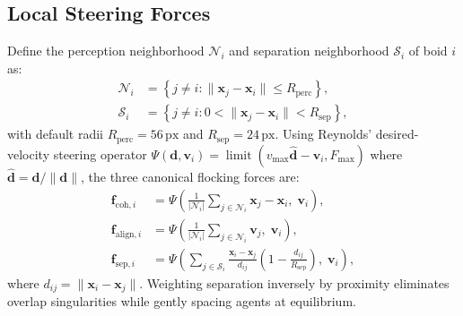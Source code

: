 \documentclass[10pt,twocolumn]{article}
\begin{document}
\subsection{Local Steering Forces}
Define the perception neighborhood $\mathcal{N}_i$ and separation neighborhood $\mathcal{S}_i$ of boid $i$ as:
\begin{align}
    \mathcal{N}_i &= \left\{ j \neq i : \|\mathbf{x}_j - \mathbf{x}_i\| \le R_{\text{perc}} \right\}, \\
    \mathcal{S}_i &= \left\{ j \neq i : 0 < \|\mathbf{x}_j - \mathbf{x}_i\| < R_{\text{sep}} \right\},
\end{align}
with default radii $R_{\text{perc}} = 56\,\text{px}$ and $R_{\text{sep}} = 24\,\text{px}$. Using Reynolds' desired-velocity steering operator $\Psi(\mathbf{d}, \mathbf{v}_i) = \operatorname{limit}\!\left(v_{\max}\hat{\mathbf{d}} - \mathbf{v}_i, F_{\max}\right)$ where $\hat{\mathbf{d}} = \mathbf{d}/\|\mathbf{d}\|$, the three canonical flocking forces are:
\begin{align}
    \mathbf{f}_{\text{coh}, i} &= \Psi\!\left(\frac{1}{|\mathcal{N}_i|}\sum_{j \in \mathcal{N}_i} \mathbf{x}_j - \mathbf{x}_i,\; \mathbf{v}_i\right), \\
    \mathbf{f}_{\text{align}, i} &= \Psi\!\left(\frac{1}{|\mathcal{N}_i|}\sum_{j \in \mathcal{N}_i} \mathbf{v}_j,\; \mathbf{v}_i\right), \\
    \mathbf{f}_{\text{sep}, i} &= \Psi\!\left(\sum_{j \in \mathcal{S}_i} \frac{\mathbf{x}_i - \mathbf{x}_j}{d_{ij}}\left(1 - \frac{d_{ij}}{R_{\text{sep}}}\right),\; \mathbf{v}_i\right),
\end{align}
where $d_{ij} = \|\mathbf{x}_i - \mathbf{x}_j\|$. Weighting separation inversely by proximity eliminates overlap singularities while gently spacing agents at equilibrium.
\end{document}
